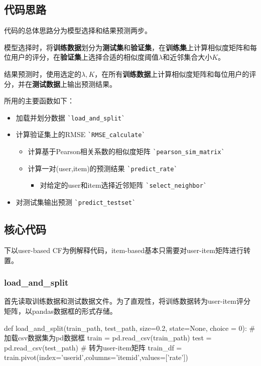 \documentclass[12pt, a4paper]{ctexart}
\begin{document}
\subsection{代码思路}

代码的总体思路分为模型选择和结果预测两步。

模型选择时，将\textbf{训练数据}划分为\textbf{测试集}和\textbf{验证集}，在\textbf{训练集}上计算相似度矩阵和每位用户的评分，在\textbf{验证集}上选择合适的相似度阈值$\lambda$和近邻集合大小$K$。

结果预测时，使用选定的$\lambda,K$，在所有\textbf{训练数据}上计算相似度矩阵和每位用户的评分，并在\textbf{测试数据}上输出预测结果。

所用的主要函数如下：

\begin{itemize}
    \item 加载并划分数据 \verb|`load_and_split`|
    \item 计算验证集上的RMSE  \verb|`RMSE_calculate`|
    \begin{itemize}
        \item 计算基于Pearson相关系数的相似度矩阵 \verb|`pearson_sim_matrix`|
        \item 计算一对(user,item)的预测结果 \verb|`predict_rate`|
        \begin{itemize}
            \item 对给定的user和item选择近邻矩阵 \verb|`select_neighbor`|
        \end{itemize}
    \end{itemize}
    \item 对测试集输出预测 \verb|`predict_testset`|
\end{itemize}

\subsection{核心代码}
下以user-based CF为例解释代码，item-based基本只需要对user-item矩阵进行转置。
\subsubsection{load\_and\_split}

首先读取训练数据和测试数据文件。为了直观性，将训练数据转为user-item评分矩阵，以pandas数据框的形式存储。
\begin{python}
def load_and_split(train_path, test_path, size=0.2, state=None, choice = 0):
  # 加载csv数据集为pd数据框
  train = pd.read_csv(train_path)
  test = pd.read_csv(test_path)
  # 转为user-item矩阵
  train_df = train.pivot(index='userid',columns='itemid',values=['rate'])    
\end{python}
\end{document}
